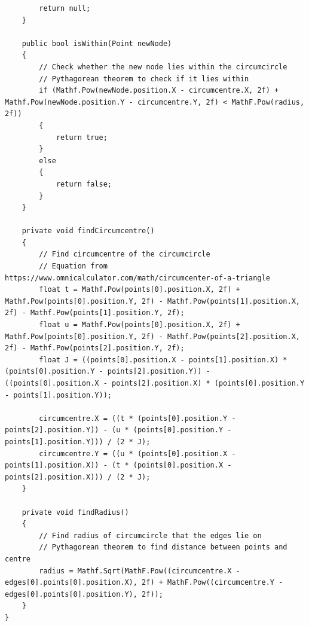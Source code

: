 \documentclass{article}
\begin{document}
\begin{lstlisting}
        return null;
    }

    public bool isWithin(Point newNode)
    {
        // Check whether the new node lies within the circumcircle
        // Pythagorean theorem to check if it lies within
        if (Mathf.Pow(newNode.position.X - circumcentre.X, 2f) + Mathf.Pow(newNode.position.Y - circumcentre.Y, 2f) < MathF.Pow(radius, 2f))
        {
            return true;
        }
        else
        {
            return false;
        }
    }

    private void findCircumcentre()
    {
        // Find circumcentre of the circumcircle
        // Equation from https://www.omnicalculator.com/math/circumcenter-of-a-triangle
        float t = Mathf.Pow(points[0].position.X, 2f) + Mathf.Pow(points[0].position.Y, 2f) - Mathf.Pow(points[1].position.X, 2f) - Mathf.Pow(points[1].position.Y, 2f);
        float u = Mathf.Pow(points[0].position.X, 2f) + Mathf.Pow(points[0].position.Y, 2f) - Mathf.Pow(points[2].position.X, 2f) - Mathf.Pow(points[2].position.Y, 2f);
        float J = ((points[0].position.X - points[1].position.X) * (points[0].position.Y - points[2].position.Y)) - ((points[0].position.X - points[2].position.X) * (points[0].position.Y - points[1].position.Y));

        circumcentre.X = ((t * (points[0].position.Y - points[2].position.Y)) - (u * (points[0].position.Y - points[1].position.Y))) / (2 * J);
        circumcentre.Y = ((u * (points[0].position.X - points[1].position.X)) - (t * (points[0].position.X - points[2].position.X))) / (2 * J);
    }

    private void findRadius()
    {
        // Find radius of circumcircle that the edges lie on
        // Pythagorean theorem to find distance between points and centre 
        radius = Mathf.Sqrt(MathF.Pow((circumcentre.X - edges[0].points[0].position.X), 2f) + MathF.Pow((circumcentre.Y - edges[0].points[0].position.Y), 2f));
    }
}
\end{lstlisting}
\end{document}
